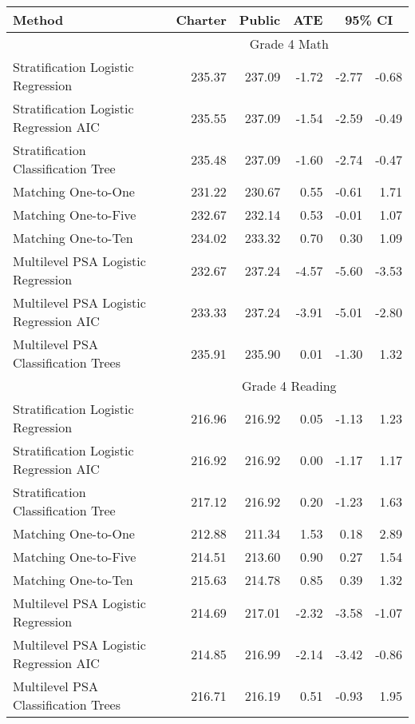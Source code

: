 \begin{table}[ht]
\centering
\begin{tabular}{lrrrrr}
  \hline Method & Charter & Public & ATE & \multicolumn{2}{c}{95\% CI} \\   \hline & \multicolumn{5}{c}{Grade 4 Math} \\ \cline{2-6} Stratification Logistic Regression & 235.37 & 237.09 & -1.72 & -2.77 & -0.68 \\ 
  Stratification Logistic Regression AIC & 235.55 & 237.09 & -1.54 & -2.59 & -0.49 \\ 
  Stratification Classification Tree & 235.48 & 237.09 & -1.60 & -2.74 & -0.47 \\ 
  Matching One-to-One & 231.22 & 230.67 & 0.55 & -0.61 & 1.71 \\ 
  Matching One-to-Five & 232.67 & 232.14 & 0.53 & -0.01 & 1.07 \\ 
  Matching One-to-Ten & 234.02 & 233.32 & 0.70 & 0.30 & 1.09 \\ 
  Multilevel PSA Logistic Regression & 232.67 & 237.24 & -4.57 & -5.60 & -3.53 \\ 
  Multilevel PSA Logistic Regression AIC & 233.33 & 237.24 & -3.91 & -5.01 & -2.80 \\ 
  Multilevel PSA Classification Trees & 235.91 & 235.90 & 0.01 & -1.30 & 1.32 \\ 
    \hline & \multicolumn{5}{c}{Grade 4 Reading} \\ \cline{2-6} Stratification Logistic Regression & 216.96 & 216.92 & 0.05 & -1.13 & 1.23 \\ 
  Stratification Logistic Regression AIC & 216.92 & 216.92 & 0.00 & -1.17 & 1.17 \\ 
  Stratification Classification Tree & 217.12 & 216.92 & 0.20 & -1.23 & 1.63 \\ 
  Matching One-to-One & 212.88 & 211.34 & 1.53 & 0.18 & 2.89 \\ 
  Matching One-to-Five & 214.51 & 213.60 & 0.90 & 0.27 & 1.54 \\ 
  Matching One-to-Ten & 215.63 & 214.78 & 0.85 & 0.39 & 1.32 \\ 
  Multilevel PSA Logistic Regression & 214.69 & 217.01 & -2.32 & -3.58 & -1.07 \\ 
  Multilevel PSA Logistic Regression AIC & 214.85 & 216.99 & -2.14 & -3.42 & -0.86 \\ 
  Multilevel PSA Classification Trees & 216.71 & 216.19 & 0.51 & -0.93 & 1.95 \\ 

\end{tabular}
\end{table}
